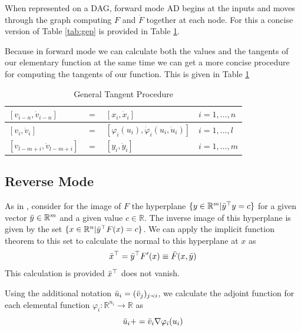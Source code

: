 \documentclass{article}
\begin{document}
When represented on a DAG, forward mode AD begins at the inputs and moves through the graph computing $F$ and $\Dot{F}$ together at each node. For this a concise version of Table \ref{tab:gep} is provided in Table \ref{tab:gtp}.

Because in forward mode we can calculate both the values and the tangents of our elementary function at the same time we can get a more concise procedure for computing the tangents of our function. This is given in Table \ref{tab:gtp}

\begin{table}[h]
    \centering
    \begin{tabular}{|lcll|}
        \hline
        $[v_{i-n}, \Dot{v}_{i-n}]$ & $=$ & $[x_{i}, \Dot{x}_{i}]$ & $i = 1, \ldots, n$ \\
        \hline
        $[v_{i}, \Dot{v}_{i}]$ & $=$ & $[\varphi_i (u_i), \Dot{\varphi}_i(u_i, \Dot{u}_i)]$ & $i = 1, \ldots, l$ \\
        \hline
        $[v_{l-m+i}, \Dot{v}_{l-m+i}]$ & $=$ & $[y_{i}, \Dot{y}_{i}]$ & $i = 1, \ldots, m$ \\
        \hline
    \end{tabular}
    \caption{General Tangent Procedure}
    \label{tab:gtp}
\end{table}

\subsection{Reverse Mode}

As in \cite{dhamarticle}, consider for the image of $F$ the hyperplane $\{ y \in \mathbb{R}^m | \Bar{y}^\top y = c\}$ for a given vector $\Bar{y} \in \mathbb{R}^m$ and a given value $c \in \mathbb{R}$. The inverse image of this hyperplane is given by the set $\{ x \in \mathbb{R}^n | \Bar{y}^\top F(x) = c\}$. We can apply the implicit function theorem to this set to calculate the normal to this hyperplane at $x$ as
\begin{equation*}
    \Bar{x}^\top = \Bar{y}^\top F'(x) \equiv \Bar{F}(x, \Bar{y})
\end{equation*}
This calculation is provided $\Bar{x}^\top$ does not vanish.

Using the additional notation $\Bar{u}_i = (\Bar{v}_j)_{j \prec i}$, we calculate the adjoint function for each elemental function $\varphi_i : \mathbb{R}^{n_i} \longrightarrow \mathbb{R}$ as
\begin{equation*}
    \Bar{u}_i += \Bar{v}_i \nabla \varphi_i (u_i)
\end{equation*}
\end{document}
